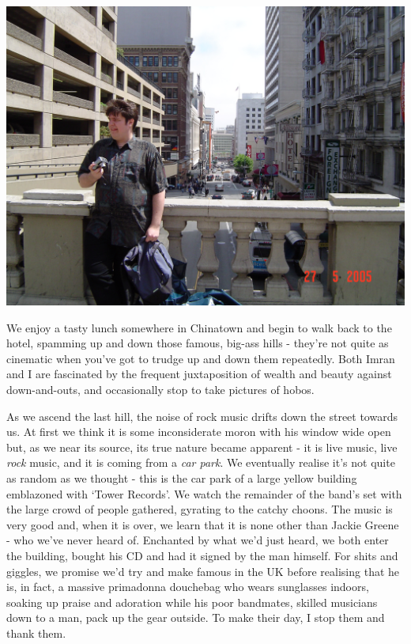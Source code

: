 \documentclass[a5paper,titlepage,11pt]{book}
\begin{document}
\begin{center}\includegraphics[width=\textwidth]{gfx/DSC00625}\end{center}

We enjoy a tasty lunch somewhere in Chinatown and begin to walk back to the hotel, spamming up and down those famous, big-ass hills - they're not quite as cinematic when you've got to trudge up and down them repeatedly.  Both Imran and I are fascinated by the frequent juxtaposition of wealth and beauty against down-and-outs, and occasionally stop to take pictures of hobos.

As we ascend the last hill, the noise of rock music drifts down the street towards us.  At first we think it is some inconsiderate moron with his window wide open but, as we near its source, its true nature became apparent - it is live music, live \emph{rock} music, and it is coming from a \emph{car park}.  We eventually realise it's not quite as random as we thought - this is the car park of a large yellow building emblazoned with `Tower Records'.  We watch the remainder of the band's set with the large crowd of people gathered, gyrating to the catchy choons.  The music is very good and, when it is over, we learn that it is none other than Jackie Greene - who we've never heard of.  Enchanted by what we'd just heard, we both enter the building, bought his CD and had it signed by the man himself.  For shits and giggles, we promise we'd try and make famous in the UK before realising that he is, in fact, a massive primadonna douchebag who wears sunglasses indoors, soaking up praise and adoration while his poor bandmates, skilled musicians down to a man, pack up the gear outside.  To make their day, I stop them and thank them.
\end{document}
